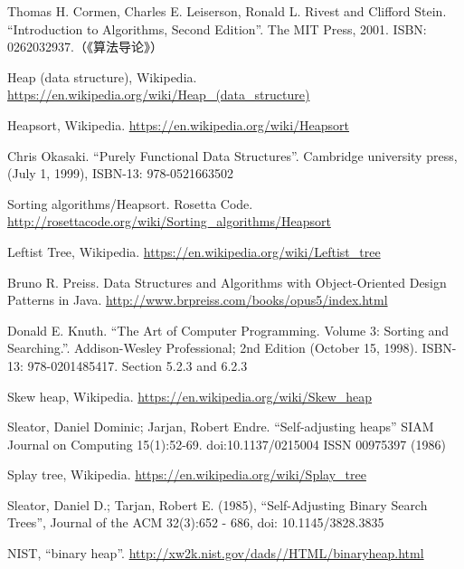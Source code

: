 \documentclass[b5paper]{ctexart}
\begin{document}
\ifx\wholebook\relax \else
\begin{thebibliography}{99}

Thomas H. Cormen, Charles E. Leiserson, Ronald L. Rivest and Clifford Stein. ``Introduction to Algorithms, Second Edition''. The MIT Press, 2001. ISBN: 0262032937.（《算法导论》）

Heap (data structure), Wikipedia. \url{https://en.wikipedia.org/wiki/Heap_(data_structure)}

Heapsort, Wikipedia. \url{https://en.wikipedia.org/wiki/Heapsort}

Chris Okasaki. ``Purely Functional Data Structures''. Cambridge university press, (July 1, 1999), ISBN-13: 978-0521663502

Sorting algorithms/Heapsort. Rosetta Code. \url{http://rosettacode.org/wiki/Sorting_algorithms/Heapsort}

Leftist Tree, Wikipedia. \url{https://en.wikipedia.org/wiki/Leftist_tree}

Bruno R. Preiss. Data Structures and Algorithms with Object-Oriented Design Patterns in Java. \url{http://www.brpreiss.com/books/opus5/index.html}

Donald E. Knuth. ``The Art of Computer Programming. Volume 3: Sorting and Searching.''. Addison-Wesley Professional;
2nd Edition (October 15, 1998). ISBN-13: 978-0201485417. Section 5.2.3 and 6.2.3

Skew heap, Wikipedia. \url{https://en.wikipedia.org/wiki/Skew_heap}

Sleator, Daniel Dominic; Jarjan, Robert Endre. ``Self-adjusting heaps'' SIAM Journal on Computing 15(1):52-69. doi:10.1137/0215004 ISSN 00975397 (1986)

Splay tree, Wikipedia. \url{https://en.wikipedia.org/wiki/Splay_tree}

Sleator, Daniel D.; Tarjan, Robert E. (1985), ``Self-Adjusting Binary Search Trees'', Journal of the ACM 32(3):652 - 686, doi: 10.1145/3828.3835

NIST, ``binary heap''. \url{http://xw2k.nist.gov/dads//HTML/binaryheap.html}

\end{thebibliography}
\end{document}
